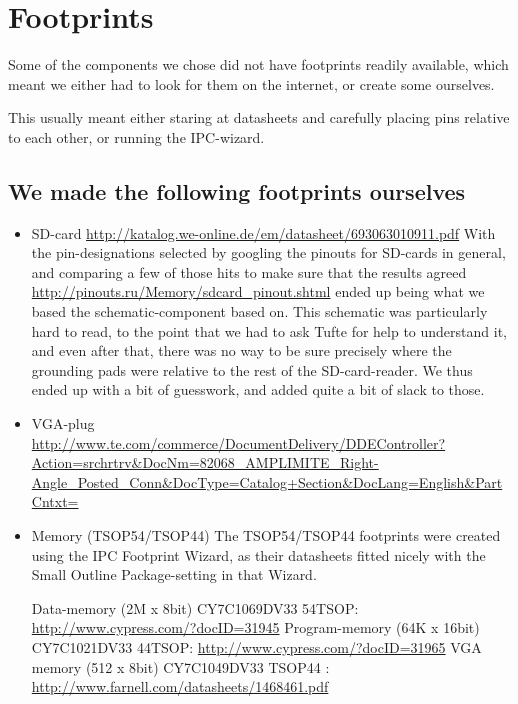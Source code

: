 \section {Footprints}
Some of the components we chose did not have footprints readily available, which
meant we either had to look for them on the internet, or create some ourselves.

This usually meant either staring at datasheets and carefully placing pins
relative to each other, or running the IPC-wizard.

\subsection {We made the following footprints ourselves}
\begin {itemize}
\item SD-card \url{http://katalog.we-online.de/em/datasheet/693063010911.pdf}
  With the pin-designations selected by googling the pinouts for SD-cards in
  general, and comparing a few of those hits to make sure that the results
  agreed \url{http://pinouts.ru/Memory/sdcard_pinout.shtml} ended up being what
  we based the schematic-component based on. This schematic was particularly hard
  to read, to the point that we had to ask Tufte for help to understand it, and even
  after that, there was no way to be sure precisely where the grounding pads were relative
  to the rest of the SD-card-reader. We thus ended up with a bit of guesswork, and added
  quite a bit of slack to those.
\item VGA-plug \url{http://www.te.com/commerce/DocumentDelivery/DDEController?Action=srchrtrv&DocNm=82068_AMPLIMITE_Right-Angle_Posted_Conn&DocType=Catalog+Section&DocLang=English&PartCntxt=}
\item Memory (TSOP54/TSOP44)
The TSOP54/TSOP44 footprints were created using the IPC Footprint Wizard, as
their datasheets fitted nicely with the Small Outline Package-setting in that
Wizard.

Data-memory (2M x 8bit) CY7C1069DV33 54TSOP:
\url{http://www.cypress.com/?docID=31945} Program-memory (64K x 16bit)
CY7C1021DV33 44TSOP: \url{http://www.cypress.com/?docID=31965} VGA memory (512 x
8bit) CY7C1049DV33 TSOP44 : \url{http://www.farnell.com/datasheets/1468461.pdf}
\end {itemize}

